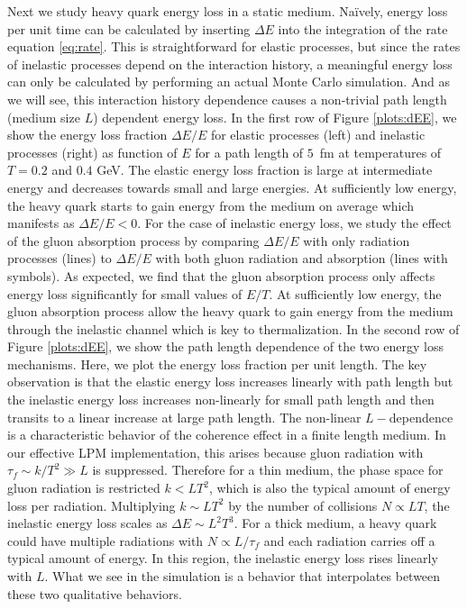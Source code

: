 \documentclass[aps, prc, reprint, amsmath, groupedaddress, nofootinbib]{revtex4-1}
\begin{document}
Next we study heavy quark energy loss in a static medium.
Na\"ively, energy loss per unit time can be calculated by inserting $\Delta E$ into the integration of the rate equation \ref{eq:rate}. 
This is straightforward for elastic processes, but since the rates of inelastic processes depend on the interaction history, a meaningful energy loss can only be calculated by performing an actual Monte Carlo simulation.
And as we will see, this interaction history dependence causes a non-trivial path length (medium size $L$) dependent energy loss.
In the first row of Figure \ref{plots:dEE}, we show the energy loss fraction $\Delta E/E$ for elastic processes (left) and inelastic processes (right) as function of $E$ for a path length of $5$~fm at temperatures of $T=0.2$ and $0.4$  GeV.
The elastic energy loss fraction is large at intermediate energy and decreases towards small and large energies.
At sufficiently low energy, the heavy quark starts to gain energy from the medium on average which manifests as $\Delta E/E < 0$.
For the case of inelastic energy loss, we study the effect of the gluon absorption process by comparing $\Delta E/E$ with only radiation processes (lines) to $\Delta E/E$ with both gluon radiation and absorption (lines with symbols).
As expected, we find that the gluon absorption process only affects energy loss significantly for small values of $E/T$.
At sufficiently low energy, the gluon absorption process allow the heavy quark to gain energy from the medium through the inelastic channel which is key to thermalization.
In the second row of Figure \ref{plots:dEE}, we show the path length dependence of the two energy loss mechanisms.
Here, we plot the energy loss fraction per unit length.
The key observation is that the elastic energy loss increases linearly with path length but the inelastic energy loss increases non-linearly for small path length and then transits to a linear increase at large path length. 
The non-linear $L-$dependence is a characteristic behavior of the coherence effect in a finite length medium. 
In our effective LPM implementation, this arises because gluon radiation with $\tau_f \sim k/T^2 \gg L$ is suppressed.
Therefore for a thin medium, the phase space for gluon radiation is restricted $k < LT^2$, which is also the typical amount of energy loss per radiation.
Multiplying $k \sim LT^2$ by the number of collisions $N \propto LT$, the inelastic energy loss scales as $\Delta E \sim L^2T^3$.
For a thick medium, a heavy quark could have multiple radiations with $N \propto L/\tau_f$ and each radiation carries off a typical amount of energy. 
In this region, the inelastic energy loss rises linearly with $L$.
What we see in the simulation is a behavior that interpolates between these two qualitative behaviors.
\end{document}

